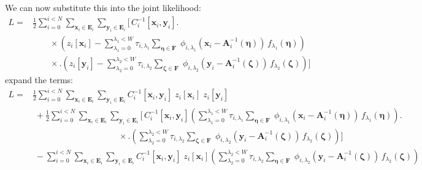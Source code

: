 \documentclass[DM,authoryear,toc]{lsstdoc}
\begin{document}
We can now substitute this into the joint likelihood:
\begin{align}
L = &
    \frac{1}{2} \sum_{i=0}^{i<N}
        \sum_{\bm{x}_i \in \bm{E}_i}
        \sum_{\bm{y}_i \in \bm{E}_i}
        \Bigg[
        \,C_i^{-1}[\bm{x}_i, \bm{y}_i]
        \Bigg.
        \nonumber\\
    & \qquad \times
        \left(
            z_i[\bm{x}_i]
            - \sum_{\lambda_1=0}^{\lambda_1 < W} \tau_{i,\lambda_1}
                \sum_{\bm{\eta} \in \bm{F}}
                        \;\phi_{i,\lambda_1}\!\left(
                            \bm{x}_i - \bm{A}_i^{-1}(\bm{\eta})
                        \right)
                        \, f_{\lambda_1}(\bm{\eta})
        \right) \nonumber\\
    & \qquad \times
    \Bigg.
        \left(
            z_i[\bm{y}_i]
            - \sum_{\lambda_2=0}^{\lambda_2 < W} \tau_{i,\lambda_2}
                \sum_{\bm{\zeta} \in \bm{F}}
                        \;\phi_{i,\lambda_2}\!\left(
                            \bm{y}_i - \bm{A}_i^{-1}(\bm{\zeta})
                        \right)
                        \, f_{\lambda_2}(\bm{\zeta})
        \right)
    \Bigg]
\end{align}
expand the terms:
\begin{align}
L =&
    \frac{1}{2} \sum_{i=0}^{i<N}
        \sum_{\bm{x}_i \in \bm{E}_i}
        \sum_{\bm{y}_i \in \bm{E}_i}
        C_i^{-1}[\bm{x}_i, \bm{y}_i]
        \;z_i[\bm{x}_i]
        \;z_i[\bm{y}_i]
    \nonumber\\
&\; +
    \frac{1}{2} \sum_{i=0}^{i<N}
        \sum_{\bm{x}_i \in \bm{E}_i}
        \sum_{\bm{y}_i \in \bm{E}_i}
        \Bigg[
        \,C_i^{-1}[\bm{x}_i, \bm{y}_i]
        \left(
            \sum_{\lambda_1=0}^{\lambda_1 < W} \tau_{i,\lambda_1}
                \sum_{\bm{\eta} \in \bm{F}}
                        \;\phi_{i,\lambda_1}\!\left(
                            \bm{x}_i - \bm{A}_i^{-1}(\bm{\eta})
                        \right)
                        \, f_{\lambda_1}(\bm{\eta})
        \right)
        \Bigg.
    \nonumber\\
&\qquad\qquad\qquad\qquad\qquad \times
        \Bigg.
        \left(
            \sum_{\lambda_2=0}^{\lambda_2 < W} \tau_{i,\lambda_2}
                \sum_{\bm{\zeta} \in \bm{F}}
                        \;\phi_{i,\lambda_2}\!\left(
                            \bm{y}_i - \bm{A}_i^{-1}(\bm{\zeta})
                        \right)
                        \, f_{\lambda_2}(\bm{\zeta})
        \right)
        \Bigg]
    \nonumber\\
&\; -
    \sum_{i=0}^{i<N}
        \sum_{\bm{x}_i \in \bm{E}_i}
        \sum_{\bm{y}_i \in \bm{E}_i}
        C_i^{-1}[\bm{x}_i, \bm{y}_i]
        \; z_i[\bm{x}_i]
        \left(
            \sum_{\lambda_2=0}^{\lambda_2 < W} \tau_{i,\lambda_2}
                \sum_{\bm{\eta} \in \bm{F}}
                        \;\phi_{i,\lambda_2}\!\left(
                            \bm{y}_i - \bm{A}_i^{-1}(\bm{\zeta})
                        \right)
                        \, f_{\lambda_2}(\bm{\zeta})
        \right)
\end{align}
\end{document}
